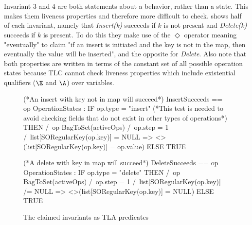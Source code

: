 \documentclass{uit-thesis}
\begin{document}
\\\\
Invariant 3 and 4 are both statements about a behavior, rather than a state. This makes them liveness properties and therefore more difficult to check.  shows half of each invariant, namely that \textit{Insert(k)} succeeds if $k$ is not present and \textit{Delete(k)} succeeds if $k$ is present. To do this they make use of the $\Diamond$ operator meaning "eventually" to claim "if an insert is initiated and the key is not in the map, then eventually the value will be inserted", and the opposite for \textit{Delete}. Also note that both properties are written in terms of the constant set of all possible operation states because TLC cannot check liveness properties which include existential qualifiers ($\E$ and $\A$) over variables.
\begin{figure}[h]
    \begin{tla}
(*An insert with key not in map will succeed*)
InsertSucceeds ==
    \A op \in OperationStates :
        IF op.type = "insert"
        (*This test is needed to avoid checking fields that do not exist in other types of operations*)
        THEN
            /\ op \in BagToSet(activeOps)
            /\ op.step = 1
            /\ list[SORegularKey(op.key)] = NULL
            => <>(list[SORegularKey(op.key)] = op.value)
        ELSE TRUE

(*A delete with key in map will succeed*)
DeleteSucceeds ==
    \A op \in OperationStates :
        IF op.type = "delete"
        THEN
            /\ op \in BagToSet(activeOps)
            /\ op.step = 1
            /\ list[SORegularKey(op.key)] /= NULL
        => <>(list[SORegularKey(op.key)] = NULL)
        ELSE TRUE
        
    \end{tla}
\begin{tlatex}
\@x{}%
%
\@xx{}%
%
%
%
%
%
\@xx{}%
%
%
%
%
%
\@pvspace{8.0pt}%
\@x{}%
%
\@xx{}%
%
%
%
%
%
%
%
%
\@pvspace{8.0pt}%
\end{tlatex}
    \caption{The claimed invariants as TLA predicates}
    \label{fig:invariants}
\end{figure}
\end{document}

